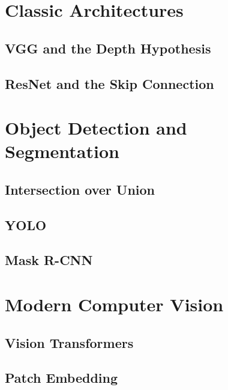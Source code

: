 \section{Classic Architectures}
\label{sec:cv-architectures}

\subsection{VGG and the Depth Hypothesis}

\subsection{ResNet and the Skip Connection}


\section{Object Detection and Segmentation}
\label{sec:detection-segmentation}

\subsection{Intersection over Union}

\subsection{YOLO}

\subsection{Mask R-CNN}

\section{Modern Computer Vision}
\label{sec:modern-cv}

\subsection{Vision Transformers}

\subsection{Patch Embedding}

